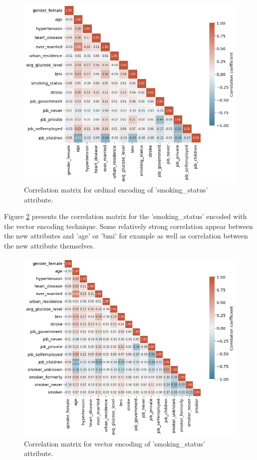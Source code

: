 \begin{figure}[H]
\centering
\includegraphics[scale=0.5]{../figures/correlationMatrix_smokingOrdinalEncoding.png}
\caption{Correlation matrix for ordinal encoding of 'smoking\_status' attribute.}
\label{figure_Xcorr_ordinal}
\end{figure}

Figure \ref{figure_Xcorr_vector} presents the correlation matrix for the 'smoking\_status' encoded 
with the vector encoding technique. Some relatively strong correlation appear between the new 
attributes and 'age' or 'bmi' for example as well as correlation between the new attribute 
themselves. 

\begin{figure}[H]
\centering
\includegraphics[scale=0.5]{../figures/correlationMatrix_smokingVectorEncoding.png}
\caption{Correlation matrix for vector encoding of 'smoking\_status' attribute.}
\label{figure_Xcorr_vector}
\end{figure}

